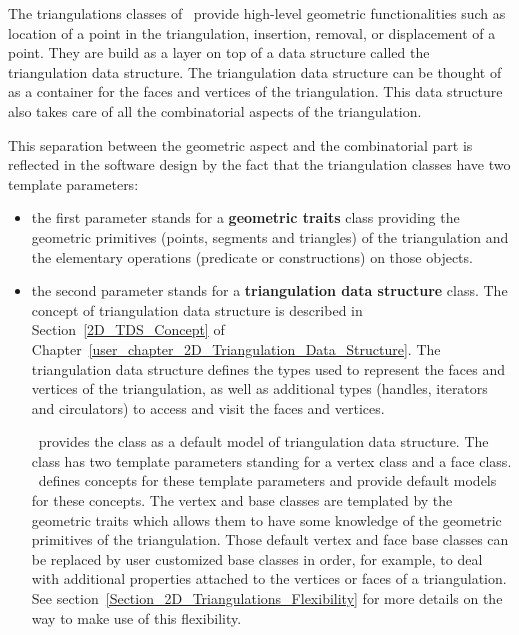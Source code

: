 The triangulations  classes of \cgal\  
provide high-level geometric functionalities
such as location of a point in the triangulation, insertion, removal, or displacement of a point.
They are build as a layer on top of a data structure
called the triangulation data structure.
The triangulation data structure   can be thought 
of as a container for the faces and vertices of the triangulation.
This data structure  also takes care
of all the combinatorial aspects of the triangulation.

This separation between the
geometric aspect and the combinatorial part
is reflected in the software design by the fact
that the triangulation classes have two template parameters:

\begin{itemize}
\item {} the first parameter stands for a
\textbf{geometric traits} class providing 
the geometric primitives (points, segments and triangles) 
of  the triangulation and the elementary
operations (predicate or constructions) on those objects.

\item {} the second parameter stands for a
\textbf{triangulation data structure} class. The concept
of triangulation data structure is described in
 Section~\ref{2D_TDS_Concept} of
Chapter~\ref{user_chapter_2D_Triangulation_Data_Structure}.
The triangulation data structure defines the types
used to represent the faces and vertices of the triangulation,
as well as additional types (handles, iterators and circulators)
to access and visit the faces and vertices.

\cgal\ provides the class 
as a  default model of triangulation data structure.
The class \ccc{Triangulation_data_structure_2<Vb,Fb>}
has two template parameters standing for
a vertex class and a face class.
\cgal\ defines concepts 
for these template parameters
and provide default models for these concepts.
The vertex and base classes are templated by the geometric
traits which allows them to have some knowledge of the geometric
primitives of the triangulation. 
Those default vertex and  face base classes
can be replaced by 
user customized base classes in order, for example, to deal
with additional properties attached to the vertices or faces
of a triangulation. See section~\ref{Section_2D_Triangulations_Flexibility}
for more details on the way to make use of this flexibility.
\end{itemize}

